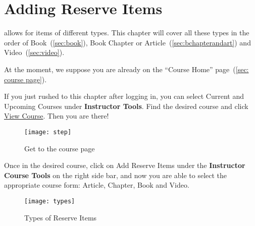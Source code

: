 \chapter{Adding Reserve Items}
\label{ch:add}
\ares allows for items of different types. This chapter will cover all these types in the order of Book~(\autoref{sec:book}), Book Chapter or Article~(\autoref{sec:bchapterandart}) and Video~(\autoref{sec:video}). 

At the moment, we suppose you are already on the ``Course Home'' page~(\autoref{sec: course page}). 

If you just rushed to this chapter after logging in, you can select {\imp Current and Upcoming Courses} under \textbf{Instructor Tools}. Find the desired course and click \uline{View Course}. Then you are there!

\vspace*{4ex}
\begin{figure}[h]
    \centering
    \texttt{[image: step]}
    \caption{Get to the course page}
    \label{fig:go to course}
\end{figure}
\vspace*{2ex}

Once in the desired course, click on {\imp Add Reserve Items} under the \textbf{Instructor Course Tools} on the right side bar, and now you are able to select the appropriate course form: Article, Chapter, Book and Video. 

\vspace*{4ex}
\begin{figure}[h]
    \centering
    \texttt{[image: types]}
    \caption{Types of Reserve Items}
    \label{fig: re-type}
\end{figure}
\vspace*{1ex}


